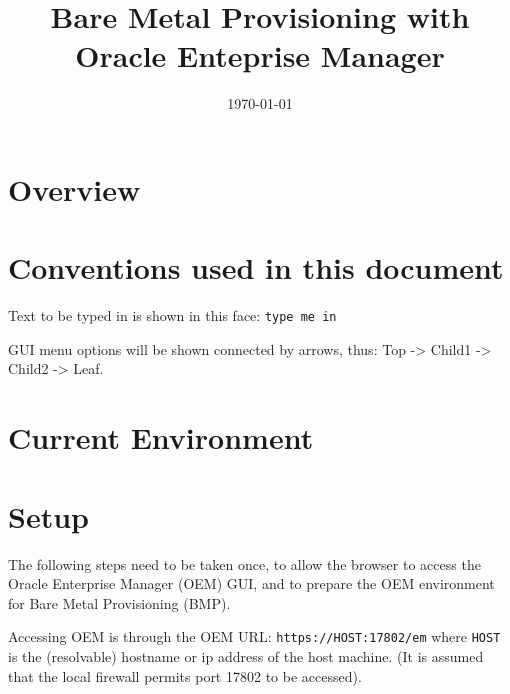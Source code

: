 \documentclass[11pt]{article}
\date{\today}
\title{Bare Metal Provisioning with Oracle Enteprise Manager}
\begin{document}
\maketitle
\tableofcontents

\section{Overview}
\label{sec-1}
\section{Conventions used in this document}
\label{sec-2}
Text to be typed in is shown in this face: \texttt{type me in}

GUI menu options will be shown connected by arrows, thus: Top -> Child1 -> Child2 -> Leaf.


\section{Current Environment}
\label{sec-3}
\section{Setup}
\label{sec-4}
The following steps need to be taken once, to allow the browser to access the Oracle Enterprise Manager (OEM) GUI, and to prepare the OEM environment for Bare Metal Provisioning (BMP).

Accessing OEM is through the OEM URL: \texttt{https://HOST:17802/em} where \texttt{HOST} is the (resolvable) hostname or ip address of the host machine. (It is assumed that the local firewall permits port 17802 to be accessed).
\end{document}
